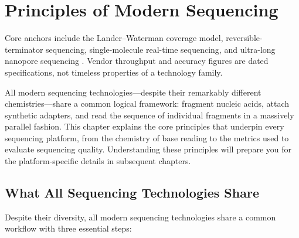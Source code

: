 \chapter{Principles of Modern Sequencing}
\label{ch:seqprinciples}

\begin{sourcebox}
Core anchors include the Lander--Waterman coverage model, reversible-terminator sequencing, single-molecule real-time sequencing, and ultra-long nanopore sequencing \cite{landerwaterman1988,bentley2008,eid2009,jain2018}. Vendor throughput and accuracy figures are dated specifications, not timeless properties of a technology family.
\end{sourcebox}

\begin{keyconcept}
All modern sequencing technologies---despite their remarkably different chemistries---share a common logical framework: fragment nucleic acids, attach synthetic adapters, and read the sequence of individual fragments in a massively parallel fashion. This chapter explains the core principles that underpin every sequencing platform, from the chemistry of base reading to the metrics used to evaluate sequencing quality. Understanding these principles will prepare you for the platform-specific details in subsequent chapters.
\end{keyconcept}

\section{What All Sequencing Technologies Share}
\label{sec:seqprinciples:shared}

Despite their diversity, all modern sequencing technologies share a common workflow with three essential steps:

